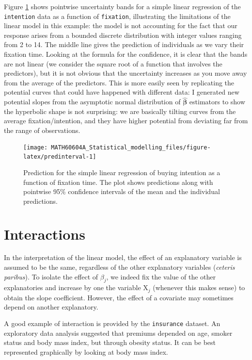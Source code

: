 \documentclass[
  11pt,
  letterpaper,
]{book}
\theoremstyle{definition}
\theoremstyle{definition}
\theoremstyle{definition}
\theoremstyle{remark}
\begin{document}
Figure \ref{fig:predinterval} shows pointwise uncertainty bands for a simple linear regression of the \texttt{intention} data as a function of \texttt{fixation}, illustrating the limitations of the linear model in this example: the model is not accounting for the fact that our response arises from a bounded discrete distribution with integer values ranging from 2 to 14. The middle line gives the prediction of individuals as we vary their fixation time. Looking at the formula for the confidence, it is clear that the bands are not linear (we consider the square root of a function that involves the predictors), but it is not obvious that the uncertainty increases as you move away from the average of the predictors. This is more easily seen by replicating the potential curves that could have happened with different data: I generated new potential slopes from the asymptotic normal distribution of \(\widehat{\boldsymbol{\beta}}\) estimators to show the hyperbolic shape is not surprising: we are basically tilting curves from the average fixation/intention, and they have higher potential from deviating far from the range of observations.

\begin{figure}

{\centering \texttt{[image: MATH60604A\_Statistical\_modelling\_files/figure-latex/predinterval-1]} 

}

\caption{Prediction for the simple linear regression of buying intention as a function of fixation time. The plot shows predictions along with pointwise 95\% confidence intervals of the mean and the individual predictions.}\label{fig:predinterval}
\end{figure}

\hypertarget{interactions}{%
\section{Interactions}\label{interactions}}

In the interpretation of the linear model, the effect of an explanatory variable is assumed to be the same, regardless of the other explanatory variables (\emph{ceteris paribus}). To isolate the effect of \(\beta_j\), we indeed fix the value of the other explanatories and increase by one the variable \(\mathrm{X}_j\) (whenever this makes sense) to obtain the slope coefficient. However, the effect of a covariate may sometimes depend on another explanatory.

A good example of interaction is provided by the \texttt{insurance} dataset. An exploratory data analysis suggested that premiums depended on age, smoker status and body mass index, but through obesity status. It can be best represented graphically by looking at body mass index.
\end{document}
